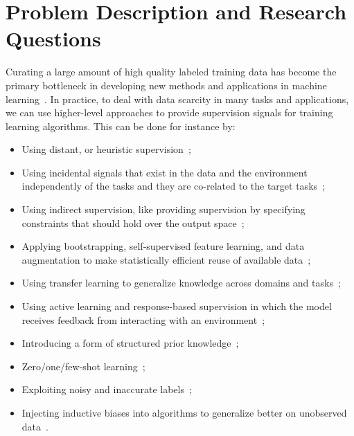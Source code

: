\section{Problem Description and Research Questions}
Curating a large amount of high quality labeled training data has become the primary bottleneck in developing new methods and applications in machine learning~\citep{Ratner:2016}. 
In practice, to deal with data scarcity in many tasks and applications, we can use higher-level approaches to provide supervision signals for training learning algorithms. 
This can be done for instance by:
\begin{itemize}
\item 
Using distant, or heuristic supervision~\citep{Deriu2016:SemEval,Severyn:2015:SemEval, Dehghani:2016:SIGIR, dehghani:2018:ICLR, Dehghani:2017:nips_metalearn, Ratner:2016,Rekatsinas:2017,Varma:2017};
%
\item
Using incidental signals that exist in the data and the environment independently of the tasks and they are co-related to the target tasks~\citep{roth2017incidental}; 
%
\item
Using indirect supervision, like providing supervision by specifying constraints that should hold over the output space~\citep{stewart2017label, clarke2010driving};
%
\item
Applying bootstrapping, self-supervised feature learning, and data augmentation to make statistically efficient reuse of available data~\citep{cubuk2018autoaugment, dosovitskiy2016discriminative,donahue2016adversarial};
%
\item
Using transfer learning to generalize knowledge across domains and tasks~\citep{Ruder:2019};
%
\item
Using active learning and response-based supervision in which the model receives feedback from interacting with an environment~\citep{clarke2010driving,riezler2014response};
%
\item
Introducing a form of structured prior knowledge~\citep{Dehghani:CIKM2016:long,Dehghani:2016:ICTIR};
%
\item
Zero/one/few-shot learning~\citep{vinyals2016matching,finn2017model,snell2017prototypical,socher2013zero};
%
\item
Exploiting noisy and inaccurate labels~\citep{Vahdat:2017, Lee:2013,Hinton:2015,Brodley:1999,reed2014training, Patrini:2016, patrini2016loss,malach2017decoupling};
%
\item
Injecting inductive biases into algorithms to generalize better on unobserved data~\citep{cohen2016group, cohen2016steerable, Dehghani:ICLR:2019}.
\end{itemize}

